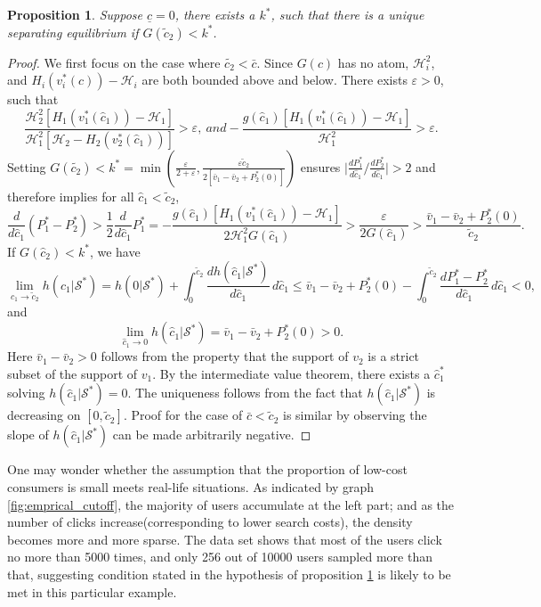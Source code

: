 \documentclass[14pt]{article}
\theoremstyle{plain}
\newtheorem{prop}[thm]{Proposition}
\theoremstyle{definition}
\theoremstyle{remark}
\DeclareRobustCommand\1{\futurelet\oneNext\oneCheck}
\renewcommand{\S}{\mathcal{S}}
\renewcommand{\H}{\mathcal{H}}
\begin{document}
\begin{prop}\label{prop: separating_eq_existence}
Suppose $\underline{c}=0$, there exists a $k^*$, such that there is a unique separating equilibrium if $G(\tilde{c}_2)<k^*$.
\end{prop}
\begin{proof}
We first focus on the case where $\tilde{c_2}<\bar{c}$.
Since $G(c)$ has no atom, $\H_i^2$, and  $H_i(v_i^*(c))-\H_i$ are both bounded above and below. There exists $\varepsilon>0$, such that \[\frac{\H_2^2[H_1(v_1^*(\hat{c}_1))-\H_1]}{\H_1^2 [\H_2-H_2(v_2^*(\hat{c}_1))]}>\varepsilon,\: and -\frac{g(\hat{c}_1)[H_1(v_1^*(\hat{c}_1))-\H_1]}{\H_1^2}>\varepsilon.\] 
Setting $G(\tilde{c_2})<k^*=\min(\frac{\varepsilon}{2+\varepsilon}, \frac{\varepsilon\tilde{c}_2}{2[\bar{v}_1-\bar{v}_2+P_2^*(0)]})$ ensures $\lvert\frac{d P_1^*}{d \hat{c}_1}\big/\frac{d P_2^*}{d \hat{c}_1}\rvert >2$ and therefore implies for all $\hat{c}_1< \tilde{c}_2$,
\[
\frac{d}{d \hat{c}_1}(P_1^*-P_2^*)>\frac{1}{2}\frac{d}{d \hat{c}_1}P_1^* = -\frac{g(\hat{c}_1)[H_1(v_1^*(\hat{c}_1))-\H_1]}{2\H_1^2G(\hat{c}_1)}>\frac{\varepsilon}{2G(\hat{c}_1)}> \frac{\bar{v}_1-\bar{v}_2+P_2^*(0)}{\tilde{c}_2}.
\]
If $G(\hat{c}_2)<k^*$, we have
\[
\lim_{\hat{c}_1 \to \tilde{c}_2}h(\hat{c}_1|\S^*) = h(0|\S^*) + \int_0^{\tilde{c}_2}\frac{d h(\hat{c}_1|\S^*)}{d\hat{c}_1}\,d\hat{c}_1\leq \bar{v}_1-\bar{v}_2+P_2^*(0)- \int_0^{\tilde{c}_2}\frac{d P_1^*-P_2^*}{d\hat{c}_1}\,d\hat{c}_1<0,
\]
and
\[\lim_{\hat{c}_1 \to 0} h(\hat{c}_1|\S^*)= \bar{v}_1 -\bar{v}_2 + P_2^*(0)>0.\]
Here $\bar{v}_1-\bar{v}_2>0$ follows from the property that the support of $v_2$ is a strict subset of the support of $v_1$.
By the intermediate value theorem, there exists a $\hat{c}_1^*$ solving $h(\hat{c}_1|\S^*)=0$. The uniqueness follows from the fact that $h(\hat{c}_1|\S^*)$ is decreasing on $[0,\tilde{c}_2]$.
Proof for the case of $\bar{c}<\tilde{c}_2$ is similar by observing the slope of $h(\hat{c}_1|\S^*)$ can be made arbitrarily negative.
\end{proof}
One may wonder whether the assumption that the proportion of low-cost consumers is small meets real-life situations. As indicated by graph \ref{fig:emprical_cutoff}, the majority of users accumulate at the left part; and as the number of clicks increase(corresponding to lower search costs), the density becomes more and more sparse. The data set shows that most of the users click no more than 5000 times, and only 256 out of 10000 users sampled more than that, suggesting condition stated in the hypothesis of proposition \ref{prop: separating_eq_existence} is likely to be met in this particular example.
\end{document}
